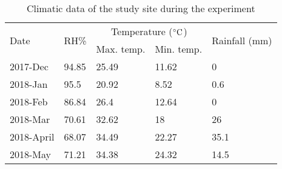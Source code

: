 \begin{table*}[]
	\caption{Climatic data of the study site during the experiment \label{tableR1}}
\begin{tabular*}{\textwidth}{l@{\extracolsep{\fill}}llll}
\toprule
\multirow{2}{*}{Date} & \multirow{2}{*}{RH\%} & \multicolumn{2}{c}{Temperature ($\celsius$)} & \multirow{2}{*}{Rainfall (mm)} \\ \cmidrule(){3-4} 
                      &                       & Max. temp.              & Min. temp.             &                                \\ \midrule
2017-Dec              & 94.85                 & 25.49                 & 11.62                & 0                              \\
2018-Jan              & 95.5                  & 20.92                 & 8.52                 & 0.6                            \\
2018-Feb              & 86.84                 & 26.4                  & 12.64                & 0                              \\
2018-Mar              & 70.61                 & 32.62                 & 18                   & 26                             \\
2018-April            & 68.07                 & 34.49                 & 22.27                & 35.1                           \\
2018-May              & 71.21                 & 34.38                 & 24.32                & 14.5                           \\ \hline
\end{tabular*}
\end{table*}